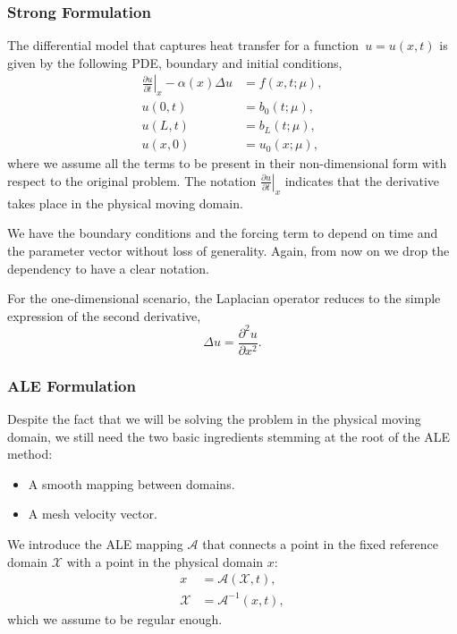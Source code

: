 \documentclass[../main.tex]{subfiles}
\newcommand{\alemap}{\ensuremath{\mathcal{A}}}
\newcommand{\aleX}{\ensuremath{\mathcal{X}}}
\begin{document}
\subsubsection{Strong Formulation}
The differential model that captures heat transfer for a function~$u = u(x,t)$ is given by the following PDE, boundary and initial conditions,
\begin{subequations}
    \begin{align}
        \left.\frac{\partial u}{\partial t}\right|_{x} - \alpha(x) \Delta u &= f(x, t; \mu), \label{eq:1d_fom_strong_pde}\\
        u(0, t) &= b_0(t; \mu), \\
        u(L, t) &= b_L(t; \mu), \\
        u(x, 0) &= u_0(x; \mu),
    \end{align}
\end{subequations}
where we assume all the terms to be present in their non-dimensional form with respect to the original problem. 
The notation $\left.\frac{\partial u}{\partial t}\right|_{x}$ indicates that the derivative takes place in the physical moving domain. 

We have the boundary conditions and the forcing term to depend on time and the parameter vector without loss of generality.
Again, from now on we drop the dependency to have a clear notation.

For the one-dimensional scenario, the Laplacian operator reduces to the simple expression of the second derivative,
\begin{equation}
    \Delta u = \frac{\partial^2 u}{\partial x^2}.
\end{equation}

\subsubsection{ALE Formulation}
Despite the fact that we will be solving the problem in the physical moving domain, 
we still need the two basic ingredients stemming at the root of the ALE method:
\begin{itemize}
    \item A smooth mapping between domains.
    \item A mesh velocity vector.
\end{itemize}

We introduce the ALE mapping $\alemap$ that connects a point in the fixed reference domain $\mathcal{X}$ with a point in the physical domain $x$:
\begin{subequations}
    \begin{align}
        x &= \alemap(\aleX, t), \\
        \aleX &= \alemap^{-1}(x, t),
    \end{align}
\end{subequations}
which we assume to be regular enough.
\end{document}
